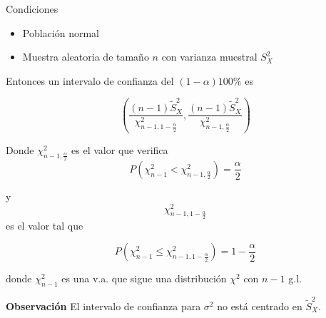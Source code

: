 \documentclass[12pt]{report}
\begin{document}
    Condiciones
    \begin{itemize}
    \item Poblaci\'on normal
    \item Muestra aleatoria de tama\~{n}o $n$ con varianza muestral $S_{X}^2$
    \end{itemize}
    Entonces un intervalo de confianza del $(1-\alpha)100\%$ es

    $$\left(  \frac{(n-1)
    \tilde{S}_{X}^2}{\chi_{n-1,1-\frac{\alpha}{2}}^2},
    \frac{(n-1)
    \tilde{S}_{X}^2}{\chi_{n-1,\frac{\alpha}{2}}^2}\right)$$

    Donde $\chi_{n-1,\frac{\alpha}{2}}^2$ es el valor que verifica
$$P(\chi_{n-1}^2<\chi_{n-1,\frac{\alpha}{2}}^2)=\frac{\alpha}{2}$$

    y $$\chi_{n-1,1-\frac{\alpha}{2}}^2$$ es el valor tal que


       $$P(\chi_{n-1}^2\leq\chi_{n-1,1-\frac{\alpha}{2}}^2)=1-\frac{\alpha}{2}$$

        donde $\chi_{n-1}^2$ es  una v.a. que sigue una distribuci\'on $\chi^2$ con $n-1$ g.l.

        \textbf{Observaci\'on}
        El intervalo de confianza para $\sigma^2$ no est\'a centrado en
        $\tilde{S}_{X}^2$.
\end{document}
